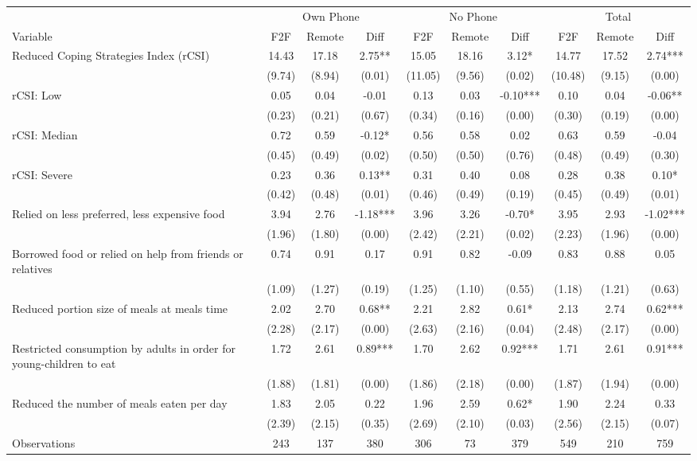 \begin{tabular}{l*{9}c}
\hline\hline
 & \multicolumn{3}{c}{Own Phone} & \multicolumn{3}{c}{No Phone} & \multicolumn{3}{c}{Total}\\ 
Variable & F2F & Remote & Diff & F2F & Remote & Diff & F2F & Remote & Diff \\
\hline
Reduced Coping Strategies Index (rCSI)&14.43&17.18&2.75**&15.05&18.16&3.12*&14.77&17.52&2.74***\\
&(9.74)&(8.94)&(0.01)&(11.05)&(9.56)&(0.02)&(10.48)&(9.15)&(0.00)\\
rCSI: Low&0.05&0.04&-0.01&0.13&0.03&-0.10***&0.10&0.04&-0.06**\\
&(0.23)&(0.21)&(0.67)&(0.34)&(0.16)&(0.00)&(0.30)&(0.19)&(0.00)\\
rCSI: Median&0.72&0.59&-0.12*&0.56&0.58&0.02&0.63&0.59&-0.04\\
&(0.45)&(0.49)&(0.02)&(0.50)&(0.50)&(0.76)&(0.48)&(0.49)&(0.30)\\
rCSI: Severe&0.23&0.36&0.13**&0.31&0.40&0.08&0.28&0.38&0.10*\\
&(0.42)&(0.48)&(0.01)&(0.46)&(0.49)&(0.19)&(0.45)&(0.49)&(0.01)\\
Relied on less preferred, less expensive food&3.94&2.76&-1.18***&3.96&3.26&-0.70*&3.95&2.93&-1.02***\\
&(1.96)&(1.80)&(0.00)&(2.42)&(2.21)&(0.02)&(2.23)&(1.96)&(0.00)\\
Borrowed food or relied on help from friends or relatives&0.74&0.91&0.17&0.91&0.82&-0.09&0.83&0.88&0.05\\
&(1.09)&(1.27)&(0.19)&(1.25)&(1.10)&(0.55)&(1.18)&(1.21)&(0.63)\\
Reduced portion size of meals at meals time&2.02&2.70&0.68**&2.21&2.82&0.61*&2.13&2.74&0.62***\\
&(2.28)&(2.17)&(0.00)&(2.63)&(2.16)&(0.04)&(2.48)&(2.17)&(0.00)\\
Restricted consumption by adults in order for young-children to eat&1.72&2.61&0.89***&1.70&2.62&0.92***&1.71&2.61&0.91***\\
&(1.88)&(1.81)&(0.00)&(1.86)&(2.18)&(0.00)&(1.87)&(1.94)&(0.00)\\
Reduced the number of meals eaten per day&1.83&2.05&0.22&1.96&2.59&0.62*&1.90&2.24&0.33\\
&(2.39)&(2.15)&(0.35)&(2.69)&(2.10)&(0.03)&(2.56)&(2.15)&(0.07)\\
\hline
Observations & 243 & 137 & 380 & 306 & 73 & 379 & 549 & 210 & 759 \\
\hline\hline
\end{tabular}
